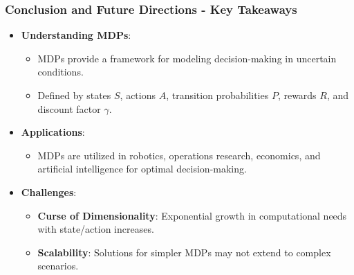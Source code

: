 \documentclass[aspectratio=169]{beamer}
\begin{document}
\begin{frame}[fragile]
    \frametitle{Conclusion and Future Directions - Key Takeaways}
    \begin{itemize}
        \item \textbf{Understanding MDPs}: 
        \begin{itemize}
            \item MDPs provide a framework for modeling decision-making in uncertain conditions.
            \item Defined by states $S$, actions $A$, transition probabilities $P$, rewards $R$, and discount factor $\gamma$.
        \end{itemize}
        
        \item \textbf{Applications}:
        \begin{itemize}
            \item MDPs are utilized in robotics, operations research, economics, and artificial intelligence for optimal decision-making.
        \end{itemize}
        
        \item \textbf{Challenges}:
        \begin{itemize}
            \item \textbf{Curse of Dimensionality}: Exponential growth in computational needs with state/action increases.
            \item \textbf{Scalability}: Solutions for simpler MDPs may not extend to complex scenarios.
        \end{itemize}
    \end{itemize}
\end{frame}
\end{document}
